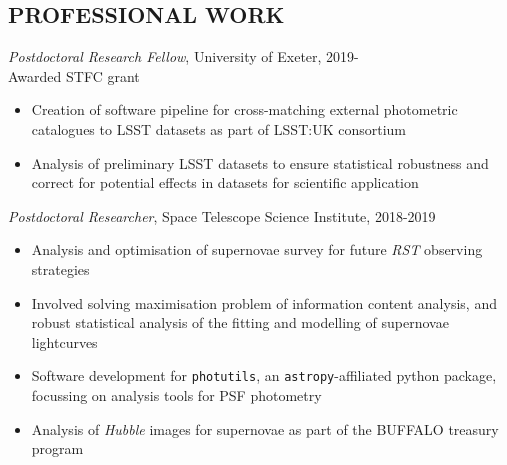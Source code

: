 \documentclass[letter, margin, 10pt]{res} %
\begin{document}
\begin{resume}

 


\vspace{-9pt}
\section{PROFESSIONAL WORK}

{\sl Postdoctoral Research Fellow}, University of Exeter, 2019-\\
\null\quad\quad Awarded STFC grant
\begin{itemize}[noitemsep,topsep=0pt,parsep=0pt,partopsep=0pt]
\item Creation of software pipeline for cross-matching external photometric catalogues to LSST datasets as part of LSST:UK consortium
\item Analysis of preliminary LSST datasets to ensure statistical robustness and correct for potential effects in datasets for scientific application
\end{itemize}
\vspace{-10pt}
{\sl Postdoctoral Researcher}, Space Telescope Science Institute, 2018-2019
\begin{itemize}[noitemsep,topsep=0pt,parsep=0pt,partopsep=0pt]
\item Analysis and optimisation of supernovae survey for future \textit{RST} observing strategies
\item Involved solving maximisation problem of information content analysis, and robust statistical analysis of the fitting and modelling of supernovae lightcurves
\item Software development for \texttt{photutils}, an \texttt{astropy}-affiliated python package, focussing on analysis tools for PSF photometry
\item Analysis of \textit{Hubble} images for supernovae as part of the BUFFALO treasury program
\end{itemize}
\vspace{-5pt}

\end{resume}
\end{document}
